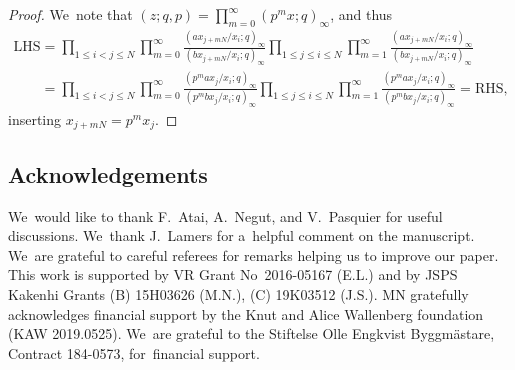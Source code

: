 \documentclass[pdftex]{sigma}%
\numberwithin{equation}{section}
\begin{document}
\begin{proof}We~note that $(z;q,p)= \prod_{m=0}^\infty (p^m x;q)_\infty$, and thus
\begin{gather*}
\text{LHS} =
 \prod_{1\leq i<j\leq N} \prod_{m=0}^\infty \frac{(ax_{j+m N}/x_i;q)_\infty}{(bx_{j+m N}/x_i;q)_\infty} \prod_{1\leq j\leq i\leq N} \prod_{m=1}^\infty \frac{(ax_{j+m N}/x_i;q)_\infty}{(bx_{j+m N}/x_i;q)_\infty}
 \\ \phantom{\text{LHS}}
{}= \prod_{1\leq i<j\leq N} \prod_{m=0}^\infty \frac{(p^m ax_{j}/x_i;q)_\infty}{(p^m b x_{j}/x_i;q)_\infty} \prod_{1\leq j\leq i\leq N}\prod_{m=1}^\infty \frac{(p^m a x_{j}/x_i;q)_\infty}{(p^m bx_{j}/x_i;q)_\infty}
= \text{RHS},
\end{gather*}
inserting $x_{j+m N}=p^mx_j$.
\end{proof}

\subsection*{Acknowledgements}

We~would like to thank F.~Atai, A.~Negut, and V.~Pasquier for useful discussions.
We~thank J.~Lamers for a~helpful comment on the manuscript.
We~are grateful to careful referees for remarks helping us to improve our paper.
This work is supported by VR Grant No~2016-05167 (E.L.) and by JSPS Kakenhi Grants (B) 15H03626 (M.N.), (C) 19K03512 (J.S.).
MN gratefully acknowledges financial support by the Knut and Alice Wallenberg foundation (KAW 2019.0525).
We~are grateful to the Stiftelse Olle Engkvist Byggm\"astare, Contract 184-0573, for~financial support.
\end{document}
